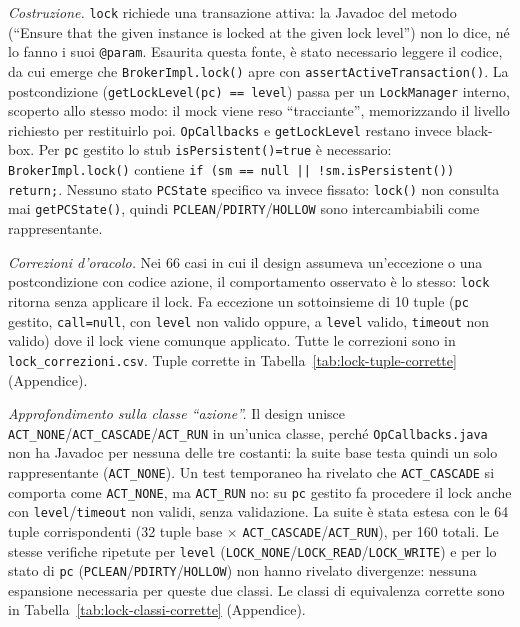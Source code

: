 \textit{Costruzione.} \texttt{lock} richiede una transazione attiva: la Javadoc del metodo
(``Ensure that the given instance is locked at the given lock level'') non lo dice, né lo fanno
i suoi \texttt{@param}. Esaurita questa fonte, è stato necessario leggere il codice, da cui
emerge che \texttt{BrokerImpl.lock()} apre con \texttt{assertActiveTransaction()}.
La postcondizione (\texttt{getLockLevel(pc) == level}) passa per un
\texttt{LockManager} interno, scoperto allo stesso modo: il mock viene reso ``tracciante'',
memorizzando il livello richiesto per restituirlo poi. \texttt{OpCallbacks} e
\texttt{getLockLevel} restano invece black-box. Per \texttt{pc} gestito lo stub
\texttt{isPersistent()=true} è necessario: \texttt{BrokerImpl.lock()} contiene
\texttt{if (sm == null || !sm.isPersistent()) return;}. Nessuno stato \texttt{PCState} specifico
va invece fissato: \texttt{lock()} non consulta mai \texttt{getPCState()}, quindi
\texttt{PCLEAN}/\texttt{PDIRTY}/\texttt{HOLLOW} sono intercambiabili come rappresentante.

\textit{Correzioni d'oracolo.} Nei 66 casi in cui il design assumeva un'eccezione o una
postcondizione con codice azione, il comportamento osservato è lo stesso: \texttt{lock} ritorna
senza applicare il lock. Fa eccezione un sottoinsieme di 10 tuple (\texttt{pc} gestito,
\texttt{call=null}, con \texttt{level} non valido oppure, a \texttt{level} valido,
\texttt{timeout} non valido) dove il lock viene comunque applicato. Tutte le correzioni sono in \texttt{lock\_correzioni.csv}. Tuple corrette in
Tabella~\ref{tab:lock-tuple-corrette} (Appendice).

\textit{Approfondimento sulla classe ``azione''.} Il design unisce
\texttt{ACT\_NONE}/\texttt{ACT\_CASCADE}/\texttt{ACT\_RUN} in un'unica classe, perché
\texttt{OpCallbacks.java} non ha Javadoc per nessuna delle tre costanti: la suite base testa
quindi un solo rappresentante (\texttt{ACT\_NONE}). Un test temporaneo ha rivelato che
\texttt{ACT\_CASCADE} si comporta come \texttt{ACT\_NONE}, ma \texttt{ACT\_RUN} no: su
\texttt{pc} gestito fa procedere il lock anche con \texttt{level}/\texttt{timeout} non validi,
senza validazione. La suite è stata estesa con le 64 tuple corrispondenti (32 tuple base
$\times$ \texttt{ACT\_CASCADE}/\texttt{ACT\_RUN}), per 160 totali. Le stesse verifiche ripetute
per \texttt{level} (\texttt{LOCK\_NONE}/\texttt{LOCK\_READ}/\texttt{LOCK\_WRITE}) e per lo stato
di \texttt{pc} (\texttt{PCLEAN}/\texttt{PDIRTY}/\texttt{HOLLOW}) non hanno rivelato divergenze:
nessuna espansione necessaria per queste due classi. Le classi di equivalenza corrette sono in
Tabella~\ref{tab:lock-classi-corrette} (Appendice).

